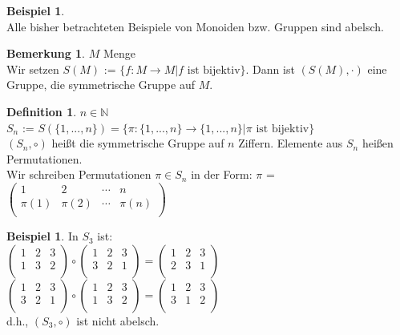 \documentclass[10pt,a4paper,numbers=endperiod]{scrartcl}
\theoremstyle{definition}
\newtheorem{defi}[satz]{Definition}
\newtheorem{bem}[satz]{Bemerkung}
\newtheorem{bsp}[satz]{Beispiel}
\begin{document}
\begin{bsp}
	$ $ \\
	Alle bisher betrachteten Beispiele von Monoiden bzw. Gruppen sind abelsch.
\end{bsp}
\begin{bem}
	$M$ Menge\\
	Wir setzen $S(M)$ := $\{f: M \rightarrow M| f \text{ ist bijektiv}\}$. Dann ist $(S(M), \cdot)$ eine Gruppe, die symmetrische Gruppe auf $M$.
\end{bem}

\begin{defi}
	$n \in \mathbb{N}$\\
	$S_n$ := $S(\{1,...,n\}) = \{\pi: \{1,...,n\} \rightarrow \{1,...,n\}| \pi \text{ ist bijektiv}\}$\\
	$(S_n, \circ)$ heißt die symmetrische Gruppe auf $n$ Ziffern. Elemente aus $S_n$ heißen Permutationen.\\
	Wir schreiben Permutationen $\pi \in S_n$ in der Form:
	$\pi$ = $\begin{pmatrix}
		1 & 2 & \cdots & n\\
		\pi(1) & \pi(2) & \cdots & \pi(n)\\
	\end{pmatrix}$
\end{defi}

\begin{bsp}
	In $S_3$ ist: \\
	$\begin{pmatrix}
	1&2&3\\
	1&3&2\\
	\end{pmatrix}
	\circ
	\begin{pmatrix}
	1&2&3\\
	3&2&1\\
	\end{pmatrix}
	= \begin{pmatrix}
	1&2&3\\
	2&3&1\\
	\end{pmatrix}$\\
	$\begin{pmatrix}
	1&2&3\\
	3&2&1\\
	\end{pmatrix}
	\circ
	\begin{pmatrix}
	1&2&3\\
	1&3&2\\
	\end{pmatrix}
	=
	\begin{pmatrix}
	1&2&3\\
	3&1&2\\
	\end{pmatrix}$\\
	
	d.h., $(S_3, \circ)$ ist nicht abelsch. 
\end{bsp}
\end{document}

